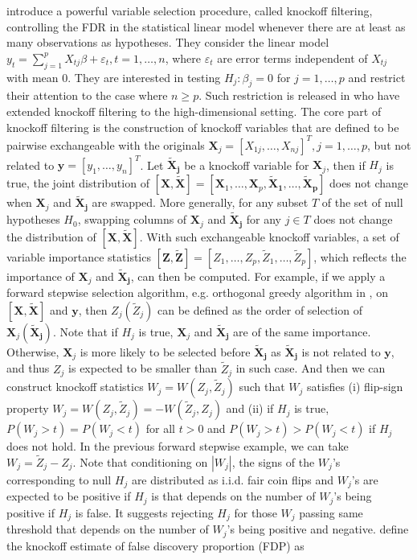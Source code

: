\documentclass[]{interact}
\theoremstyle{plain}%
\theoremstyle{definition}
\theoremstyle{remark}
\begin{document}
\cite{barber2015controlling} introduce a powerful variable selection procedure, called knockoff filtering, controlling the FDR in the statistical linear model whenever there are at least as many observations as hypotheses. They consider the linear model $y_t = \sum_{j=1}^p X_{tj} \beta + \varepsilon_t, t=1,\ldots,n$, where $\varepsilon_t$ are error terms independent of $X_{tj}$ with mean $0$. They are interested in testing $H_j: \beta_j=0$ for $j=1,\ldots, p$ and restrict their attention to the case where $n \ge p$. Such restriction is released in \cite{barber2019knockoff} who have extended knockoff filtering to the high-dimensional setting. The core part of knockoff filtering is the construction of knockoff variables that are defined to be pairwise exchangeable with the originals $\bm X_j = [X_{1j}, \ldots, X_{nj}]^T, j = 1, \ldots, p$, but not related to $\bm y = [y_1, \ldots, y_n]^T$. Let $\bm{\tilde X_j}$ be a knockoff variable for $\bm X_j$, then if $H_j$ is true, the joint distribution of $[\bm X, \bm{\tilde X}] = [\bm X_1, \ldots, \bm X_p, \bm{\tilde X_1}, \ldots, \bm{\tilde X_p}]$ does not change when $\bm X_j$ and $\bm{\tilde X_j}$ are swapped. More generally, for any subset $T$ of the set of null hypotheses $H_0$, swapping columns of $\bm X_j$ and $\bm{\tilde X_j}$ for any $j \in T$ does not change the distribution of $[\bm X, \bm{\tilde X}]$. With such exchangeable knockoff variables, a set of variable importance statistics $[\bm Z, \bm{\tilde Z}] = [Z_1, \ldots, Z_p, \tilde Z_1, \ldots, \tilde Z_p]$, which reflects the importance of $\bm X_j$ and $\bm{\tilde X_j}$, can then be computed. For example, if we apply a forward stepwise selection algorithm, e.g. orthogonal greedy algorithm in \cite{ing2017multiple}, on $[\bm X, \bm{\tilde X}]$ and $\bm y$, then $Z_j (\tilde Z_j)$ can be defined as the order of selection of $\bm X_j (\bm{\tilde X_j})$. Note that if $H_j$ is true, $\bm X_j$ and $\bm{\tilde X_j}$ are of the same importance. Otherwise, $\bm X_j$ is more likely to be selected before $\bm{\tilde X_j}$ as $\bm{\tilde X_j}$ is not related to $\bm y$, and thus $Z_j$ is expected to be smaller than $\tilde Z_j$ in such case. And then we can construct knockoff statistics $W_j = W(Z_j, \tilde Z_j)$ such that $W_j$ satisfies (i) flip-sign property $W_j = W(Z_j, \tilde Z_j) = -W(\tilde Z_j, Z_j)$ and (ii) if $H_j$ is true, $P(W_j > t) = P(W_j < t)$ for all $t>0$ and $P(W_j > t) > P(W_j < t)$ if $H_j$ does not hold. In the previous forward stepwise example, we can take $W_j = \tilde Z_j - Z_j$. Note that conditioning on $|W_j|$, the signs of the $W_j$'s corresponding to null $H_j$ are distributed as i.i.d. fair coin flips and $W_j$'s are expected to be positive if $H_j$ is that depends on the number of $W_j$'s being positive if $H_j$ is false. It suggests rejecting $H_j$ for those $W_j$ passing same threshold that depends on the number of $W_j$'s being positive and negative. \cite{barber2015controlling} define the knockoff estimate of false discovery proportion (FDP) as
\end{document}
